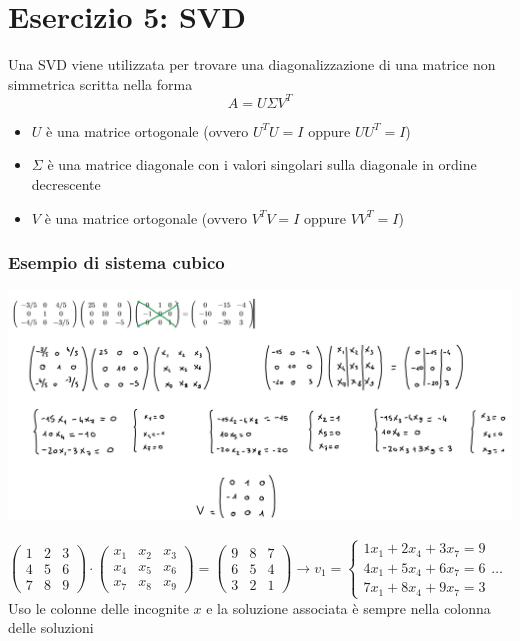 \documentclass[10pt]{article}
\begin{document}
\section{Esercizio 5: SVD}
Una SVD viene utilizzata per trovare una diagonalizzazione di una matrice non simmetrica scritta nella forma \begin{equation*}
    A = U\Sigma V^{T}
\end{equation*}
\begin{itemize}
    \item $U$ è una matrice ortogonale (ovvero $U^{T}U=I$ oppure $UU^{T}=I$)
    \item $\Sigma$ è una matrice diagonale con i valori singolari sulla diagonale in ordine decrescente
    \item $V$ è una matrice ortogonale (ovvero $V^{T}V=I$ oppure $VV^{T}=I$)
\end{itemize}
\subsubsection*{Esempio di sistema cubico}
\begin{center}
    \includegraphics[scale=0.4]{sistemacubico.png}
\end{center}
$\begin{pmatrix}
    1 & 2 & 3\\
    4 & 5 & 6\\
    7 & 8 & 9
\end{pmatrix}\cdot \begin{pmatrix}
    x_{1} & x_{2} & x_{3} \\
    x_{4} & x_{5} & x_{6} \\
    x_{7} & x_{8} & x_{9}
\end{pmatrix}=\begin{pmatrix}
    9 & 8 & 7 \\
    6 & 5 & 4 \\
    3 & 2 & 1
\end{pmatrix} \rightarrow v_{1}=\begin{cases}
    1x_{1}+2x_{4}+3x_{7}=9\\
    4x_{1}+5x_{4}+6x_{7}=6\\
    7x_{1}+8x_{4}+9x_{7}=3
\end{cases} \ldots$\\
Uso le colonne delle incognite $x$ e la soluzione associata è sempre nella colonna delle soluzioni\\
\end{document}
